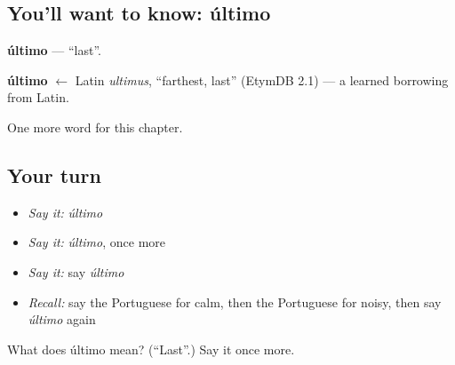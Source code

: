 \subsection*{You'll want to know: último}
\textbf{último} — \textquotedblleft{}last\textquotedblright{}.

\begin{cousinweb}
\textbf{último} $\leftarrow$ Latin \emph{ultimus}, \textquotedblleft{}farthest, last\textquotedblright{} (EtymDB 2.1) — a learned borrowing from Latin.
\end{cousinweb}

\begin{grammarlens}[title={What you've built}]
One more word for this chapter.
\end{grammarlens}

\subsection*{Your turn}
\begin{itemize}
\raggedright
  \item \emph{Say it:} \emph{último}
  \item \emph{Say it:} \emph{último}, once more
  \item \emph{Say it:} say \emph{último}
  \item \emph{Recall:} say the Portuguese for calm, then the Portuguese for noisy, then say \emph{último} again
\end{itemize}

\begin{tcolorbox}[breakable,colback=teal!4,colframe=teal!35!black,title={Before you move on}]
What does último mean? (\textquotedblleft{}Last\textquotedblright{}.) Say it once more.
\end{tcolorbox}

